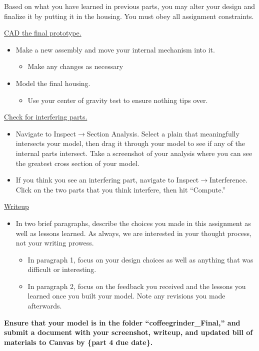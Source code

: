 \documentclass[11pt,letterpaper]{article}
\begin{document}
\MakeHandoutHeader

Based on what you have learned in previous parts, you may alter your design and finalize it
by putting it in the housing. You must obey all assignment constraints.

\begin{AssignmentSteps}
  \item \underline{CAD the final prototype.}
    \begin{itemize}
      \item Make a new assembly and move your internal mechanism into it.
        \begin{itemize}
          \item Make any changes as necessary
        \end{itemize}
      \item Model the final housing.
        \begin{itemize}
          \item Use your center of gravity test to ensure nothing tips over.
        \end{itemize}
    \end{itemize}
  \item \underline{Check for interfering parts.}
    \begin{itemize}
      \item Navigate to Inspect$\rightarrow$Section Analysis. Select a plain that meaningfully intersects your
        model, then drag it through your model to see if any of the internal parts intersect. Take a
        screenshot of your analysis where you can see the greatest cross section of your model.
      \item If you think you see an interfering part, navigate to Inspect$\rightarrow$Interference. Click on the two
        parts that you think interfere, then hit ``Compute.''
    \end{itemize}
  \item \underline{Writeup}
    \begin{itemize}
      \item In two brief paragraphs, describe the choices you made in this assignment as well as lessons
        learned. As always, we are interested in your thought process, not your writing prowess.
        \begin{itemize}
          \item In paragraph 1, focus on your design choices as well as anything that was difficult or
            interesting.
          \item In paragraph 2, focus on the feedback you received and the lessons you learned once
            you built your model. Note any revisions you made afterwards.
        \end{itemize}
    \end{itemize}
\end{AssignmentSteps}
\textbf{Ensure that your model is in the folder ``coffeegrinder\_Final,'' and submit a document with
your screenshot, writeup, and updated bill of materials to Canvas by \{part 4 due date\}.}
\end{document}
